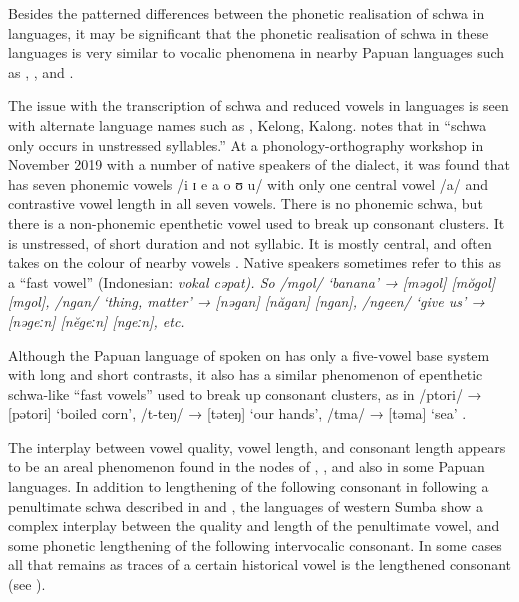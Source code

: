 Besides the patterned differences between the phonetic realisation
of schwa in  languages,
it may be significant that the phonetic realisation of schwa
in these languages is very similar to vocalic phenomena
in nearby Papuan  languages such as , , and .

The issue with the transcription of schwa
and reduced vowels in  languages is
seen with alternate language names such as , Kelong, Kalong.
\citet[35]{Baird2008} notes that in  “schwa only occurs in unstressed
syllables.” At a phonology-orthography workshop in November 2019
with a number of native speakers of the   dialect,
it was found that  has seven phonemic vowels /i ɪ e a o ʊ
u/ with only one central vowel /a/
and contrastive vowel length in all seven vowels.
There is no phonemic schwa,
but there is a non-phonemic epenthetic vowel used to break up consonant clusters.
It is unstressed, of short duration and not syllabic.
It is mostly central,
and often takes on the colour of nearby vowels \citep{Jones2020a}.
Native speakers sometimes refer to
this as a “fast vowel” (Indonesian: \it{vokal cəpat}).
So /mgol/ ‘banana’ → [məgol] {\tl} [mŏgol] {\tl} [mgol],
/ngan/ ‘thing, matter’ → [nəgan] {\tl} [năgan] {\tl} [ngan],
/ngeen/ ‘give us’ → [nəgeːn] {\tl} [nĕgeːn] {\tl} [ngeːn], etc.

Although the Papuan language of  spoken on  has only
a five-vowel base system with long
and short contrasts, it also has a similar phenomenon of epenthetic
schwa-like “fast vowels” used to break up consonant clusters,
as in /ptori/ → [pətori] ‘boiled corn’,
/t-teŋ/ → [təteŋ] ‘our hands’,
/tma/ → [təma] ‘sea’ \citep{Jones2020b}.

The interplay between vowel quality,
vowel length, and consonant length appears to be an areal phenomenon
found in the  nodes of ,
, and also in some Papuan  languages.
In addition to lengthening of the following consonant in 
following a penultimate schwa described in  and ,
the languages of western Sumba show a complex interplay between
the quality and length of the penultimate vowel,
and some phonetic lengthening of the following intervocalic consonant.
In some cases all that remains as traces of a certain historical
vowel is the lengthened consonant (see ).

